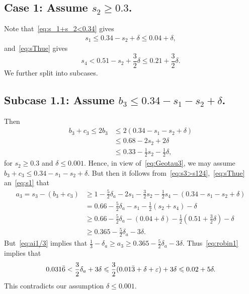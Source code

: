 \subsection*{Case 1: Assume $s_2\ge 0.3$.}

Note that~\eqref{eq:s_1+s_2<0.34} gives
\begin{align}\label{eq:s1}
s_1 \leq 0.34-s_2+\delta \le 0.04+\delta,
\end{align}
and~\eqref{eq:sThue} gives \[
s_4 < 0.51-s_2 +\frac{3}{2}\delta\le 0.21 +\frac{3}{2}\delta.
\]
We further split into subcases.

\subsection*{Subcase 1.1: Assume $b_3\le 0.34-s_1-s_2+\delta$.}

Then
\begin{align*}
b_3+c_3\le 2b_3
&\le 2(0.34-s_1-s_2+\delta)\\
&\le 0.68-2s_2 +2\delta \\
&\leq 0.33 -\frac{1}{2}s_2-\frac{1}{2}\delta,
\end{align*}
for $s_2\ge0.3$ and $\delta\leq 0.001$.
Hence, in view of~\eqref{eq:Geotau3}, we may assume $b_3+c_3\le 0.34-s_1-s_2+\delta$.
But then it follows from~\eqref{eq:s3>s124},~\eqref{eq:sThue} an~\eqref{eq:s1} that
\begin{align*}
a_3 = s_3 - (b_3 + c_3)
& \ge 1 -
\frac{5}{2}\delta_a-
2s_1 - \frac{3}{2}s_2 - \frac{1}{2}s_4 - (0.34-s_1-s_2+\delta)\\
& = 0.66
-\frac{5}{2}\delta_a
- s_1 - \frac{1}{2}(s_2 + s_4)-\delta\\
& \geq 0.66
-\frac{5}{2}\delta_a
- (0.04+\delta) - \frac{1}{2}(0.51+\frac{3}{2}\delta)-\delta\\
&\ge 0.365
-\frac{5}{2}\delta_a -3\delta.
\end{align*}
But~\eqref{eq:ai1/3} implies that $\frac{1}{3}-\delta_a \ge a_3\geq 0.365
-\frac{5}{2}\delta_a -3\delta$. Thus~\eqref{eq:robin1} implies that
\[
0.031\bar 6<\frac{3}{2}\delta_a +3\delta
\leqslant \frac{3}{2}(0.01\bar{3}+\delta+\varepsilon) +3\delta \leqslant 0.02+5\delta.
\]
This contradicts our assumption $\delta\leq 0.001$.



